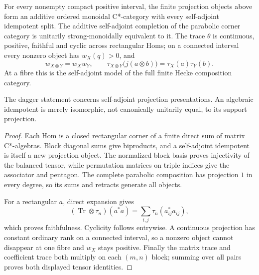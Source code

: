 \begin{theorem}
{\normalfont\statusProved}\quad
For every nonempty compact positive interval, the finite projection objects
above form an additive ordered monoidal C*-category with every self-adjoint
idempotent split.  The additive self-adjoint completion of the parabolic
corner category is unitarily strong-monoidally equivalent to it.  The trace
$\theta$ is continuous, positive, faithful and cyclic across rectangular
Homs; on a connected interval every nonzero object has $w_X(q)>0$, and
\[
 w_{X\otimes Y}=w_Xw_Y,\qquad
 \tau_{X\otimes Y}\bigl(j(a\otimes b)\bigr)=\tau_X(a)\tau_Y(b).
\]
At a fibre this is the self-adjoint model of the full finite Hecke composition
category.
\end{theorem}
\begin{scope}
The dagger statement concerns self-adjoint projection presentations.  An
algebraic idempotent is merely isomorphic, not canonically unitarily equal,
to its support projection.
\end{scope}
\begin{proof}
Each Hom is a closed rectangular corner of a finite direct sum of matrix
C*-algebras.  Block diagonal sums give biproducts, and a self-adjoint
idempotent is itself a new projection object.  The normalized block basis
proves injectivity of the balanced tensor, while permutation matrices on
triple indices give the associator and pentagon.  The complete parabolic
composition has projection $1$ in every degree, so its sums and retracts
generate all objects.

For a rectangular $a$, direct expansion gives
\[
 (\operatorname{Tr}\otimes\tau_n)(a^*a)
   =\sum_{i,j}\tau_n(a_{ij}^*a_{ij}),
\]
which proves faithfulness.  Cyclicity follows entrywise.  A continuous
projection has constant ordinary rank on a connected interval, so a nonzero
object cannot disappear at one fibre and $w_X$ stays positive.  Finally the
matrix trace and coefficient trace both multiply on each $(m,n)$ block;
summing over all pairs proves both displayed tensor identities.
\end{proof}

